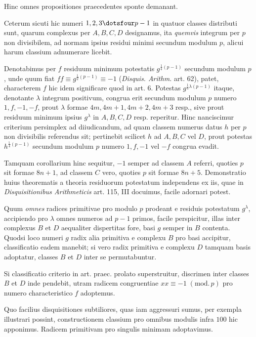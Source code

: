 Hinc omnes propositiones praecedentes sponte demanant.

Ceterum sicuti hic numeri $1,2,3\dotsfour p-1$ in quatuor classes distributi sunt, quarum complexus per $A,B,C,D$ designamus, ita \emph{quemvis} integrum per $p$ non divisibilem, ad normam ipsius residui minimi secundum modulum $p$, alicui harum classium adnumerare licebit.

Denotabimus per $f$ residuum minimum potestatis $g^{\frac14(p-1)}$ secundum modulum $p$, unde quum fiat $ff\equiv g^{\frac12(p-1)}\equiv-1$ (\emph{Disquis. Arithm.} art. 62), patet, characterem $f$ hic idem significare quod in art. 6. Potestas $g^{\frac14\lambda(p-1)}$ itaque, denotante $\lambda$ integrum positivum, congrua erit secundum modulum $p$ numero $1,f,-1,-f$, prout $\lambda$ formae $4m,4m+1,4m+2,4m+3$ resp., sive prout residuum minimum ipsius $g^\lambda$ in $A,B,C,D$ resp. reperitur. Hinc nanciscimur criterium persimplex ad diiudicandum, ad quam classem numerus datus $h$ per $p$ non divisibilis referendus sit; pertinebit scilicet $h$ ad $A,B,C$ vel $D$, prout potestas $h^{\frac14(p-1)}$ secundum modulum $p$ numero $1,f,-1$ vel $-f$ congrua evadit.

Tamquam corollarium hinc sequitur, $-1$ semper ad classem $A$ referri, quoties $p$ sit formae $8n+1$, ad classem $C$ vero, quoties $p$ sit formae $8n+5$. Demonstratio huius theorematis a theoria residuorum potestatum independens ex iis, quae in \emph{Disquisitionibus Arithmeticis} art. 115, III docuimus, facile adornari potest.

Quum \emph{omnes} radices primitivae pro modulo $p$ prodeant e residuis potestatum $g^\lambda$, accipiendo pro $\lambda$ omnes numeros ad $p-1$ primos, facile perspicitur, illas inter complexus $B$ et $D$ aequaliter dispertitas fore, basi $g$ semper in $B$ contenta. Quodsi loco numeri $g$ radix alia primitiva e complexu $B$ pro basi accipitur, classificatio eadem manebit; si vero radix primitiva e complexu $D$ tamquam basis adoptatur, classes $B$ et $D$ inter se permutabuntur.

%
Si classificatio criterio in art. praec. prolato superstruitur, discrimen inter classes $B$ et $D$ inde pendebit, utram radicem congruentiae $xx\equiv-1\; (\mathrm{mod.}\,p)$ pro numero characteristico $f$ adoptemus.

Quo facilius disquisitiones subtiliores, quas iam aggressuri sumus, per exempla illustrari possint, constructionem classium pro omnibus modulis infra $100$ hic apponimus. Radicem primitivam pro singulis minimam adoptavimus.

